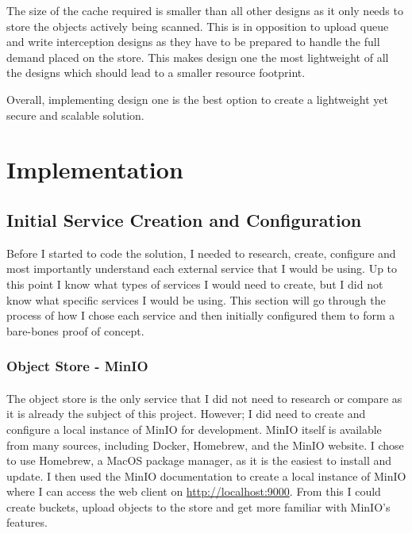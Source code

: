 \documentclass[12pt, conference, final, a4paper, onecolumn, compsoc]{IEEEtran}
\begin{document}
The size of the cache required is smaller than all other designs as it only
needs to store the objects actively being scanned. This is in opposition to
upload queue and write interception designs as they have to be prepared to
handle the full demand placed on the store. This makes design one the most
lightweight of all the designs which should lead to a smaller resource
footprint.

Overall, implementing design one is the best option to create a lightweight yet
secure and scalable solution.

\section{Implementation}


\subsection*{Initial Service Creation and
  Configuration} %


Before I started to code the solution, I needed to research, create, configure
and most importantly understand each external service that I would be using. Up
to this point I know what types of services I would need to create, but I did
not know what specific services I would be using. This section will go through
the process of how I chose each service and then initially configured them to
form a bare-bones proof of concept.

\subsubsection*{Object Store - MinIO}
\paragraph{}

The object store is the only service that I did not need to research or compare
as it is already the subject of this project. However; I did need to create and
configure a local instance of MinIO for development. MinIO itself is available
from many sources, including Docker, Homebrew, and the MinIO website. I chose to
use Homebrew, a MacOS package manager, as it is the easiest to install and
update. I then used the MinIO documentation to create a local instance of MinIO
where I can access the web client on \url{http://localhost:9000}. From this I
could create buckets, upload objects to the store and get more familiar with
MinIO's features.
\end{document}
